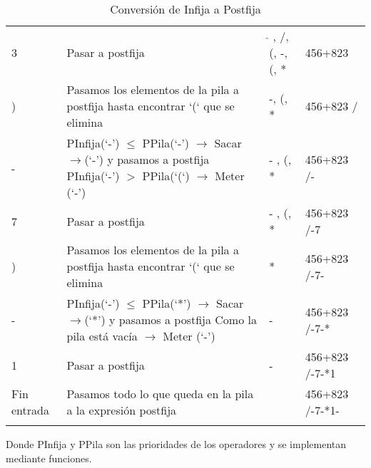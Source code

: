 \documentclass[12pt ]{article}
\begin{document}
\begin{longtable}[h]{p{2cm} p{5cm} p{2.5cm} p{2.5 cm}}
 3      &Pasar a postfija       & $\hat{{}}$ , /, (, -, (, *    &456+823        \\
        \rowcolor{gray!20} ) & Pasamos los elementos de la pila a postfija hasta encontrar ‘(‘ que se elimina   &-, (, *        &456+823\hspace{0.2 cm}$\hat{{}}$\hspace{0.2 cm} /\\


 -      &PInfija(‘-’) $\leq$ PPila(‘-’)
        $\rightarrow$ Sacar$\rightarrow$(‘-’) y pasamos a postfija
        PInfija(‘-’) $>$ PPila(‘(‘) $\rightarrow$ Meter (‘-’)   &- , (, *       &456+823\hspace{0.2 cm}$\hat{{}}$\hspace{0.2 cm} /-     \\
        \rowcolor{gray!20} 7& Pasar a postfija  &- , (, *       & 456+823\hspace{0.1 cm}$\hat{{}}$\hspace{0.1 cm} /-7\\


 )      & Pasamos los elementos de la pila a postfija hasta encontrar ‘(‘ que se elimina        &*      &  456+823\hspace{0.1 cm}$\hat{{}}$\hspace{0.1 cm} /-7- \\
        \rowcolor{gray!20}- & PInfija(‘-’) $\leq$ PPila(‘*’)
        $\rightarrow$ Sacar$\rightarrow$(‘*’) y pasamos a postfija
        Como la pila está vacía $\rightarrow$ Meter (‘-’)       &-      &456+823\hspace{0.1 cm}$\hat{{}}$\hspace{0.1 cm} /-7-*\\


        1&      Pasar a postfija&-      &456+823\hspace{0.1 cm}$\hat{{}}$\hspace{0.1 cm} /-7-*1 \\
        \rowcolor{gray!20} Fin entrada &  Pasamos todo lo que queda en la pila a la expresión postfija  &       & 456+823\hspace{0.1 cm}$\hat{{}}$\hspace{0.1 cm} /-7-*1-\\




        \caption{Conversión de Infija a Postfija}
 \end{longtable}

 Donde PInfija y PPila son las prioridades de los operadores y se implementan mediante funciones.
\end{document}
